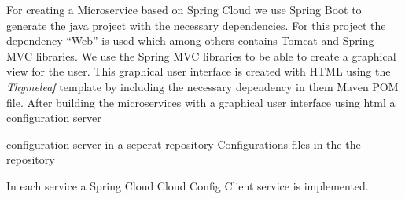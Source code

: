 For creating a Microservice based on Spring Cloud we use Spring Boot to generate the java project with the necessary dependencies. For this project the dependency ``Web'' is used which among others contains Tomcat and Spring MVC libraries. We use the Spring MVC libraries to be able to create a graphical view for the user. This graphical user interface is created with HTML using the \emph{Thymeleaf} template by including the necessary dependency in them Maven POM file. 
After building the microservices with a graphical user interface using html a configuration server 


configuration server in a seperat repository
Configurations files in the the repository

In each service a Spring Cloud Cloud Config Client service is implemented.
